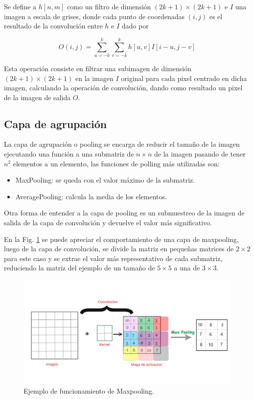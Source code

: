 Se define a $h[n,m]$ como un filtro de dimensión $(2k + 1) \times (2k + 1)$ e $I$ una imagen a escala de grises, donde cada punto de coordenadas $(i,j)$ es el
resultado de la convolución entre $h$ e $I$ dado por

\begin{equation}
    O(i,j)= \sum_{u=-k}^{k} \sum_{v=-k}^{k} h[u,v]I[i-u,j-v]
\end{equation}

Esta operación consiste en filtrar una subimagen de dimensión $(2k+1)\times(2k+1)$ en la imagen $I$ original para cada pixel centrado en dicha imagen, calculando la operación de convolución, dando como resultado un pixel de la imagen de salida $O$.

\subsection{Capa de agrupación}

La capa de agrupación o pooling se encarga de reducir el tamaño de la imagen ejecutando una función a una submatriz de $n \times n$ de la imagen pasando de tener $n^2$ elementos a un elemento, las funciones de polling más utilizadas son:

\begin{itemize}
    \item MaxPooling: se queda con el valor máximo de la submatriz.
    \item AveragePooling: calcula la media de los elementos.
\end{itemize}

Otra forma de entender a la capa de pooling es un submuestreo de la imagen de salida de la capa de convolución y devuelve el valor más significativo.

En la Fig. \ref{fig:ejemplo-mp} se puede apreciar el comportamiento de una capa de maxpooling, luego de la capa de convolución, se divide la matriz
en pequeñas matrices de $2 \times 2$ para este caso y se extrae el valor más representativo de cada submatriz, reduciendo la matriz del ejemplo de un tamaño de
$5 \times 5$ a una de $3 \times 3$.
\begin{figure}
    \centering
    \includegraphics[width=1\textwidth]{imgs/ej-maxpooling.jpg}
    \caption{Ejemplo de funcionamiento de Maxpooling.}
    \label{fig:ejemplo-mp}
\end{figure}

